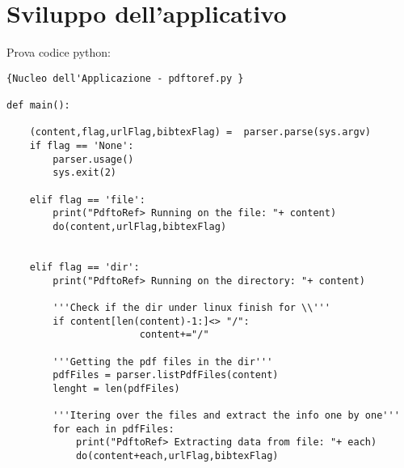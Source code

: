 \section{Sviluppo dell'applicativo}

Prova codice python:


\begin{lstlisting}[frame=r,caption=Nucleo dell'Applicazione - pdftoref.py ,breaklines=true,basicstyle=\small]{Nucleo dell'Applicazione - pdftoref.py }

def main():
       
    (content,flag,urlFlag,bibtexFlag) =  parser.parse(sys.argv)
    if flag == 'None':
        parser.usage()
        sys.exit(2)
        
    elif flag == 'file':
        print("PdftoRef> Running on the file: "+ content)
        do(content,urlFlag,bibtexFlag)

         
    elif flag == 'dir':
        print("PdftoRef> Running on the directory: "+ content)
        
        '''Check if the dir under linux finish for \\'''
        if content[len(content)-1:]<> "/":
                       content+="/"

        '''Getting the pdf files in the dir'''
        pdfFiles = parser.listPdfFiles(content)
        lenght = len(pdfFiles)
        
        '''Itering over the files and extract the info one by one'''
        for each in pdfFiles:
            print("PdftoRef> Extracting data from file: "+ each)
            do(content+each,urlFlag,bibtexFlag)



\end{lstlisting}

